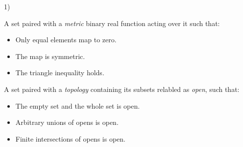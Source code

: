 \begin{multicols}{3}
  1)
\end{multicols}

\begin{multicols*}{3}
  A set paired with a \textit{metric} binary real function acting over it such that:
  \begin{itemize}
  \item Only equal elements map to zero.
  \item The map is symmetric.
  \item The triangle inequality holds.
  \end{itemize}

  A set paired with a \textit{topology} containing its subsets relabled as \textit{open}, such that:
  \begin{itemize}
  \item The empty set and the whole set is open.
  \item Arbitrary unions of opens is open.
  \item Finite intersections of opens is open.
  \end{itemize}

\end{multicols*}


